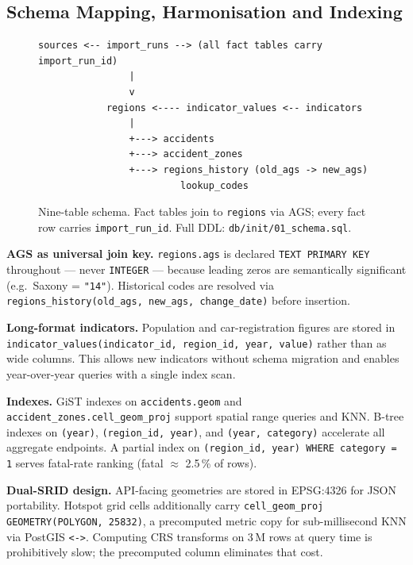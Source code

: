 \documentclass[12pt,a4paper]{article}
\begin{document}
\subsection{Schema Mapping, Harmonisation and Indexing}

\begin{figure}[H]
\centering
\begin{lstlisting}[numbers=none]
sources <-- import_runs --> (all fact tables carry import_run_id)
                |
                v
            regions <---- indicator_values <-- indicators
                |
                +---> accidents
                +---> accident_zones
                +---> regions_history (old_ags -> new_ags)
                         lookup_codes
\end{lstlisting}
\caption{Nine-table schema. Fact tables join to \texttt{regions} via AGS; every fact row carries \texttt{import\_run\_id}. Full DDL: \texttt{db/init/01\_schema.sql}.}
\label{fig:schema}
\end{figure}

\textbf{AGS as universal join key.} \texttt{regions.ags} is declared \texttt{TEXT PRIMARY KEY} throughout --- never \texttt{INTEGER} --- because leading zeros are semantically significant (e.g.\ Saxony = \texttt{"14"}). Historical codes are resolved via \texttt{regions\_history(old\_ags, new\_ags, change\_date)} before insertion.

\textbf{Long-format indicators.} Population and car-registration figures are stored in \texttt{indicator\_values(indicator\_id, region\_id, year, value)} rather than as wide columns. This allows new indicators without schema migration and enables year-over-year queries with a single index scan.

\textbf{Indexes.} GiST indexes on \texttt{accidents.geom} and \texttt{accident\_zones.cell\_geom\_proj} support spatial range queries and KNN. B-tree indexes on \texttt{(year)}, \texttt{(region\_id, year)}, and \texttt{(year, category)} accelerate all aggregate endpoints. A partial index on \texttt{(region\_id, year) WHERE category = 1} serves fatal-rate ranking (fatal $\approx$ 2.5\,\% of rows).

\textbf{Dual-SRID design.} API-facing geometries are stored in EPSG:4326 for JSON portability. Hotspot grid cells additionally carry \texttt{cell\_geom\_proj GEOMETRY(POLYGON, 25832)}, a precomputed metric copy for sub-millisecond KNN via PostGIS \texttt{<->}. Computing CRS transforms on 3\,M rows at query time is prohibitively slow; the precomputed column eliminates that cost.
\end{document}
